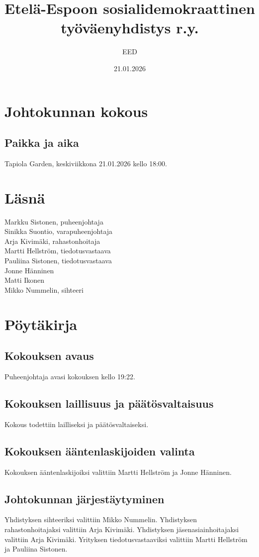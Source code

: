 \documentclass[a4paper,12pt]{article}
\title{Etelä-Espoon sosialidemokraattinen työväenyhdistys r.y.}
\author{EED}
\date{21.01.2026}
\begin{document}
\maketitle
\tableofcontents
\section*{Johtokunnan kokous}
\subsection*{Paikka ja aika}
Tapiola Garden, keskiviikkona 21.01.2026 kello 18:00.
\section*{Läsnä}
Markku Sistonen, puheenjohtaja \\
Sinikka Suontio, varapuheenjohtaja \\
Arja Kivimäki, rahastonhoitaja \\
Martti Hellström, tiedotusvastaava \\
Pauliina Sistonen, tiedotusvastaava \\
Jonne Hänninen \\
Matti Ikonen \\
Mikko Nummelin, sihteeri
\section*{Pöytäkirja}
\subsection{Kokouksen avaus}
Puheenjohtaja avasi kokouksen kello 19:22.
\subsection{Kokouksen laillisuus ja päätösvaltaisuus}
Kokous todettiin lailliseksi ja päätösvaltaiseksi.
\subsection{Kokouksen ääntenlaskijoiden valinta}
Kokouksen ääntenlaskijoiksi valittiin Martti Hellström ja Jonne Hänninen.
\subsection{Johtokunnan järjestäytyminen}
Yhdistyksen sihteeriksi valittiin Mikko Nummelin. Yhdistyksen rahastonhoitajaksi valittiin Arja Kivimäki. Yhdistyksen jäsenasiainhoitajaksi valittiin Arja Kivimäki. Yrityksen tiedotusvastaaviksi valittiin Martti Hellström ja Pauliina Sistonen.
\end{document}
